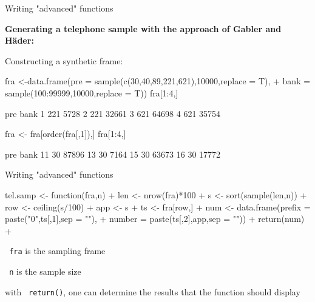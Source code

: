 \documentclass[11pt,german,hideothersubsections]{beamer}
\newcommand{\R}[1]{{\tt \color{blue}  #1}}
\begin{document}
\begin{frame}[fragile]{Writing "advanced" functions}
\footnotesize{
\vspace{-.25cm}
\begin{center}
\textbf{Generating a telephone sample with the approach of Gabler and H\"ader:}
\end{center}
\vspace{.25cm}
Constructing a synthetic frame:
\begin{Schunk}
\begin{Sinput}
 fra <-data.frame(pre = sample(c(30,40,89,221,621),10000,replace = T),
+                  bank = sample(100:99999,10000,replace = T))
 fra[1:4,]
\end{Sinput}
\begin{Soutput}
  pre  bank
1 221  5728
2 221 32661
3 621 64698
4 621 35754
\end{Soutput}
\begin{Sinput}
 fra <- fra[order(fra[,1]),]
 fra[1:4,]
\end{Sinput}
\begin{Soutput}
   pre  bank
11  30 87896
13  30  7164
15  30 63673
16  30 17772
\end{Soutput}
\end{Schunk}
}
\end{frame}
\begin{frame}[fragile]{Writing "advanced" functions}
\footnotesize{
\begin{Schunk}
\begin{Sinput}
 tel.samp <- function(fra,n){
+   len <- nrow(fra)*100
+   s <- sort(sample(len,n))
+   row <- ceiling(s/100)
+   app <- s%%100
+   ts <- fra[row,]
+   num <- data.frame(prefix = paste("0",ts[,1],sep = ""),
+                     number = paste(ts[,2],app,sep = ""))
+   return(num)
+ }
\end{Sinput}
\end{Schunk}
}

\begin{itemize}\footnotesize{
\item \R{fra} is the sampling frame
\item \R{n} is the sample size
\item with \R{return()}, one can determine the results that the function should display
}
\end{itemize}

\end{frame}
\end{document}
